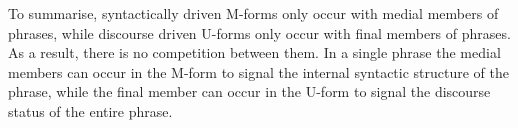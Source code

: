 \begin{exe}
	\label{ex2:160326, 18.26}
\end{exe}

To summarise, syntactically driven M-forms only
occur with medial members of phrases, while discourse
driven U-forms only occur with final members of phrases.
As a result, there is no competition between them.
In a single phrase the medial members
can occur in the M-form to signal the internal
syntactic structure of the phrase, while the final
member can occur in the U-form to signal the discourse
status of the entire phrase.